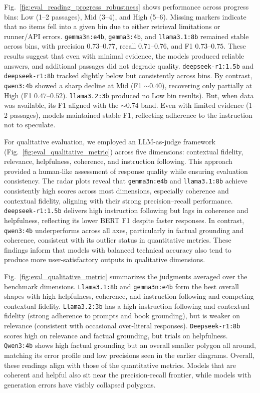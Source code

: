 Fig.~\ref{fig:eval_reading_progress_robustness} shows performance across progress bins: Low (1–2 passages), Mid (3–4), and High (5–6). Missing markers indicate that no items fell into a given bin due to either retrieval limitations or runner/API errors. \texttt{gemma3n:e4b}, \texttt{gemma3:4b}, and \texttt{llama3.1:8b} remained stable across bins, with precision $0.73$–$0.77$, recall $0.71$–$0.76$, and F1 $0.73$–$0.75$. These results suggest that even with minimal evidence, the models produced reliable answers, and additional passages did not degrade quality. \texttt{deepseek-r1:1.5b} and \texttt{deepseek-r1:8b} tracked slightly below but consistently across bins. By contrast, \texttt{qwen3:4b} showed a sharp decline at Mid (F1 $\sim 0.40$), recovering only partially at High (F1 $0.47$–$0.52$). \texttt{llama3.2:3b} produced no Low bin results).
But, when data was available, its F1 aligned with the $\sim 0.74$ band.
Even with limited evidence (1–2 passages), models maintained stable F1, reflecting adherence to the instruction not to speculate.

For qualitative evaluation, we employed an LLM-as-judge framework (Fig.~\ref{fig:eval_qualitative_metric}) across five dimensions: contextual fidelity, relevance, helpfulness, coherence, and instruction following. This approach provided a human-like assessment of response quality while ensuring evaluation consistency. The radar plots reveal that \texttt{gemma3n:e4b} and \texttt{llama3.1:8b} achieve consistently high scores across most dimensions, especially coherence and contextual fidelity, aligning with their strong precision–recall performance. \texttt{deepseek-r1:1.5b} delivers high instruction following but lags in coherence and helpfulness, reflecting its lower BERT F1 despite faster responses. In contrast, \texttt{qwen3:4b} underperforms across all axes, particularly in factual grounding and coherence, consistent with its outlier status in quantitative metrics.
These findings inform that models with balanced technical accuracy also tend to produce more user-satisfactory outputs in qualitative dimensions.

Fig.~\ref{fig:eval_qualitative_metric} summarizes the judgments averaged over the benchmark dimensions.
\texttt{Llama3.1:8b} and \texttt{gemma3n:e4b} form the best overall shapes with high helpfulness, coherence, and instruction following and competing contextual fidelity.
\texttt{Llama3.2:3b} has a high instruction following and contextual fidelity (strong adherence to prompts and book grounding), but is weaker on relevance (consistent with occasional over-literal responses).
\texttt{Deepseek-r1:8b} scores high on relevance and factual grounding, but trials on helpfulness.
\texttt{Qwen3:4b} shows high factual grounding but an overall smaller polygon all around, matching its error profile and low precisions seen in the earlier diagrams.
Overall, these readings align with those of the quantitative metrics.
Models that are coherent and helpful also sit near the precision-recall frontier, while models with generation errors have visibly collapsed polygons.

